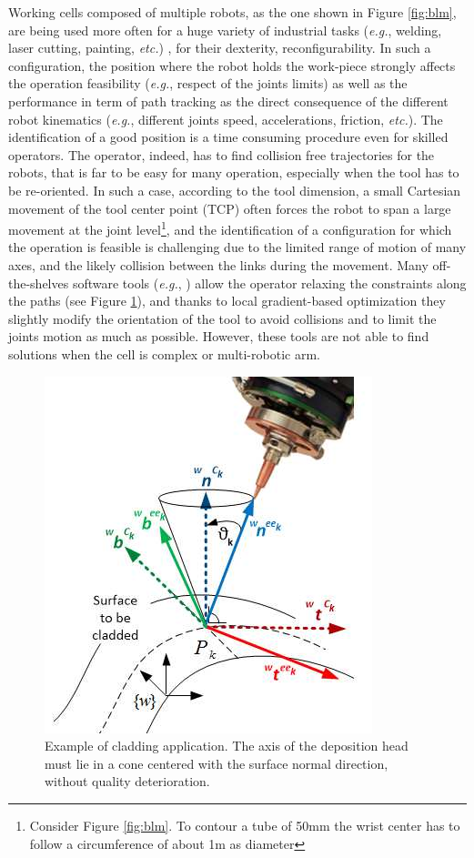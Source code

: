\documentclass[twocolumn]{svjour3}
\newcommand{\figref}[1]{Figure \ref{#1}}
\begin{document}
Working cells composed of multiple robots, as the one shown in \figref{fig:blm},  are being used more often for a huge variety of industrial tasks (\textit{e.g.}, welding, laser cutting, painting, \textit{etc.}) \cite{blmlt360,chen2013robot,ji2019industrial}, for their dexterity, reconfigurability.
In such a configuration, the position where the robot holds the work-piece strongly affects the operation feasibility (\textit{e.g.}, respect of the joints limits)  as well as the performance in term of path tracking as the direct consequence of the different robot kinematics (\textit{e.g.}, different joints speed, accelerations, friction, \textit{etc.}). 
%
The identification of a good position is a time consuming procedure even for skilled operators.
%
The operator, indeed, has to find collision free trajectories for the robots, that is far to be easy for many operation, especially when the tool has to be re-oriented. In such a case, according to the tool dimension, a small Cartesian movement of the tool center point (TCP) often forces the robot to span a large movement at the joint level\footnote{Consider \figref{fig:blm}. To contour a tube of 50mm the wrist center has to follow a circumference of about 1m as diameter}, and the identification of a configuration for which the operation is feasible is challenging due to the limited range of motion of many axes, and the likely collision between the links during the movement. 
%
Many off-the-shelves software tools (\textit{e.g.}, \cite{siemensPLMNX,abbRobotStudio}) allow the operator relaxing the constraints along the paths (see \figref{fig:task-redundacy}), and thanks to local gradient-based optimization they slightly modify the orientation of the tool to avoid collisions and to limit the joints motion as much as possible. 
However, these tools are not able to find solutions when the cell is complex or multi-robotic arm. 
%
\begin{figure}[t]
\centering
  \includegraphics[trim={0 0.6cm 0 0.6cm},clip, width=.65\columnwidth]{TechnologicalRedundancy.png}
  \caption{Example of cladding application. The axis of the deposition head must lie in a cone centered with the surface normal direction, without quality deterioration.}
  \label{fig:task-redundacy}
\end{figure}
\end{document}
